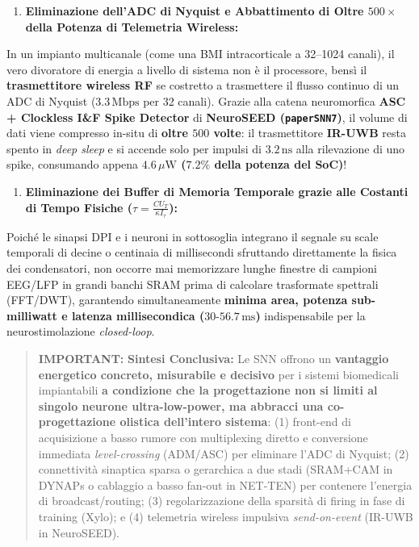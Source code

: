 \documentclass[11pt,a4paper]{article}
\begin{document}
\begin{enumerate}
  \item \textbf{Eliminazione dell'ADC di Nyquist e Abbattimento di Oltre $500\times$ della Potenza di Telemetria Wireless:}
\end{enumerate}
In un impianto multicanale (come una BMI intracorticale a 32--1024 canali), il vero divoratore di energia a livello di sistema non è il processore, bensì il \textbf{trasmettitore wireless RF} se costretto a trasmettere il flusso continuo di un ADC di Nyquist ($3.3\,\text{Mbps}$ per 32 canali). Grazie alla catena neuromorfica \textbf{ASC + Clockless I\&F Spike Detector} di \textbf{NeuroSEED (\texttt{paperSNN7})}, il volume di dati viene compresso in-situ di \textbf{oltre $500$ volte}: il trasmettitore \textbf{IR-UWB} resta spento in \textit{deep sleep} e si accende solo per impulsi di \textbf{$3.2\,\text{ns}$} alla rilevazione di uno spike, consumando appena \textbf{$4.6\,\mu\text{W}$ ($7.2\%$ della potenza del SoC)}!
\begin{enumerate}
  \item \textbf{Eliminazione dei Buffer di Memoria Temporale grazie alle Costanti di Tempo Fisiche ($\tau = \frac{C U_T}{\kappa I_\tau}$):}
\end{enumerate}
Poiché le sinapsi DPI e i neuroni in sottosoglia integrano il segnale su scale temporali di decine o centinaia di millisecondi sfruttando direttamente la fisica dei condensatori, non occorre mai memorizzare lunghe finestre di campioni EEG/LFP in grandi banchi SRAM prima di calcolare trasformate spettrali (FFT/DWT), garantendo simultaneamente \textbf{minima area, potenza sub-milliwatt e latenza millisecondica ($30\text{-}56.7\,\text{ms}$)} indispensabile per la neurostimolazione \textit{closed-loop}.

\begin{quote}
\textbf{IMPORTANT:} \textbf{Sintesi Conclusiva:}
Le SNN offrono un \textbf{vantaggio energetico concreto, misurabile e decisivo} per i sistemi biomedicali impiantabili \textbf{a condizione che la progettazione non si limiti al singolo neurone ultra-low-power, ma abbracci una co-progettazione olistica dell'intero sistema}: (1) front-end di acquisizione a basso rumore con multiplexing diretto e conversione immediata \textit{level-crossing} (ADM/ASC) per eliminare l'ADC di Nyquist; (2) connettività sinaptica sparsa o gerarchica a due stadi (SRAM+CAM in DYNAPs o cablaggio a basso fan-out in NET-TEN) per contenere l'energia di broadcast/routing; (3) regolarizzazione della sparsità di firing in fase di training (Xylo); e (4) telemetria wireless impulsiva \textit{send-on-event} (IR-UWB in NeuroSEED).
\end{quote}
\end{document}
